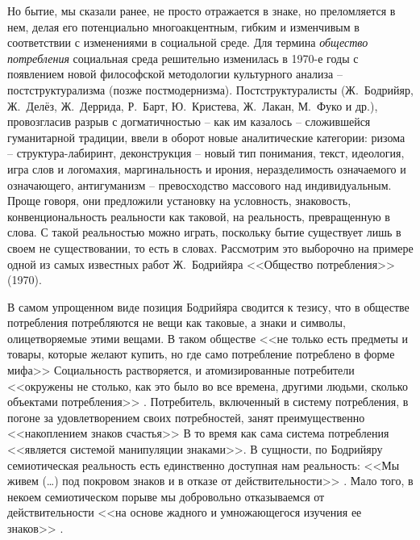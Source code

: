 Но бытие, мы сказали ранее, не просто отражается в знаке, но преломляется в
нем, делая его потенциально многоакцентным, гибким и изменчивым в соответствии
с изменениями в социальной среде. Для термина \emph{общество потребления}
социальная среда решительно изменилась в 1970-е годы с появлением новой философской
методологии культурного анализа -- постструктурализма (позже постмодернизма).
Постструктуралисты (Ж.~Бодрийяр, Ж.~Делёз, Ж.~Деррида, Р.~Барт, Ю.~Кристева, Ж.~Лакан,
М.~Фуко и др.), провозгласив разрыв с догматичностью -- как им казалось --
сложившейся гуманитарной традиции, ввели в оборот новые аналитические категории:
ризома -- структура-лабиринт, деконструкция -- новый тип понимания, текст,
идеология, игра слов и логомахия, маргинальность и ирония, неразделимость означаемого
и означающего, антигуманизм -- превосходство массового над индивидуальным\autocite{ilyin1996}.
Проще говоря, они предложили установку на условность, знаковость, конвенциональность
реальности как таковой, на реальность, превращенную в слова. С такой реальностью
можно играть, поскольку бытие существует лишь в своем не существовании,
то есть в словах. Рассмотрим это выборочно на примере одной из самых известных работ
Ж.~Бодрийяра <<Общество потребления>> (1970).

В самом упрощенном виде позиция Бодрийяра сводится к тезису, что в обществе
потребления потребляются не вещи как таковые, а знаки и символы, олицетворяемые
этими вещами. В таком обществе <<не только есть предметы и товары, которые желают
купить, но где само потребление потреблено в форме мифа>> \autocite[][3]{bodriyar_society}
Социальность растворяется, и атомизированные потребители <<окружены не столько,
как это было во все времена, другими людьми, сколько объектами потребления>> \autocite[][5]{bodriyar_society}.
Потребитель, включенный в систему потребления, в погоне за удовлетворением своих
потребностей, занят преимущественно <<накоплением знаков счастья>> \autocite[][12]{bodriyar_society}
В то время как сама система потребления <<является системой манипуляции знаками>>.
\autocite[][14]{bodriyar_society} В сущности, по Бодрийяру семиотическая реальность есть единственно
доступная нам реальность: <<Мы живем (\ldots) под покровом знаков и в отказе от
действительности>> \autocite[][15]{bodriyar_society}. Мало того, в некоем семиотическом порыве мы
добровольно отказываемся от действительности <<на основе жадного и умножающегося изучения ее
знаков>> \autocite[][16]{bodriyar_society}.

